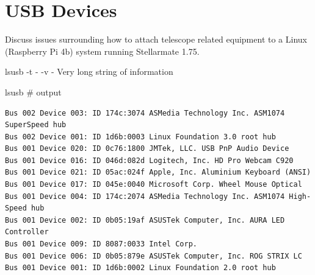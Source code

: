 \renewcommand{\footerfilename}{USB.tex}

\section{USB Devices}

Discuss issues surrounding how to attach telescope related equipment to a Linux
(Raspberry Pi 4b) system running Stellarmate 1.75.

lsusb
       -t  -  
       -v  - Very long string of information


lsusb # output
\begingroup \fontsize{10pt}{10pt}
\selectfont
\begin{verbatim} 
Bus 002 Device 003: ID 174c:3074 ASMedia Technology Inc. ASM1074 SuperSpeed hub
Bus 002 Device 001: ID 1d6b:0003 Linux Foundation 3.0 root hub
Bus 001 Device 020: ID 0c76:1800 JMTek, LLC. USB PnP Audio Device
Bus 001 Device 016: ID 046d:082d Logitech, Inc. HD Pro Webcam C920
Bus 001 Device 021: ID 05ac:024f Apple, Inc. Aluminium Keyboard (ANSI)
Bus 001 Device 017: ID 045e:0040 Microsoft Corp. Wheel Mouse Optical
Bus 001 Device 004: ID 174c:2074 ASMedia Technology Inc. ASM1074 High-Speed hub
Bus 001 Device 002: ID 0b05:19af ASUSTek Computer, Inc. AURA LED Controller
Bus 001 Device 009: ID 8087:0033 Intel Corp. 
Bus 001 Device 006: ID 0b05:879e ASUSTek Computer, Inc. ROG STRIX LC
Bus 001 Device 001: ID 1d6b:0002 Linux Foundation 2.0 root hub
\end{verbatim}
\endgroup

